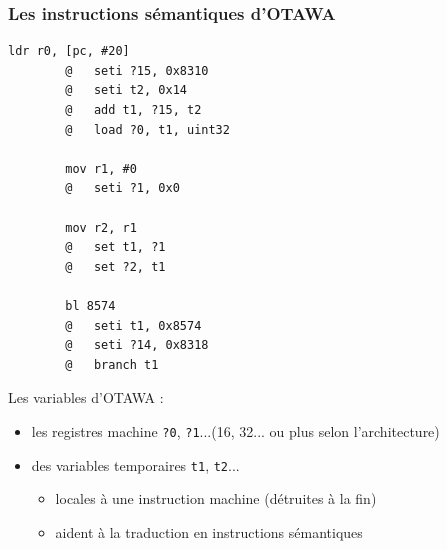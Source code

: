 \documentclass[table]{beamer}
\begin{document}
\begin{frame}[fragile]
    \frametitle{Les instructions sémantiques d'OTAWA}
    \begin{minipage}{.36\linewidth}
	\begin{lstlisting}[language={[ARM]Assembler}]
	    ldr r0, [pc, #20]
	    @	seti ?15, 0x8310
	    @	seti t2, 0x14
	    @	add t1, ?15, t2
	    @	load ?0, t1, uint32

	    mov r1, #0
	    @	seti ?1, 0x0

	    mov r2, r1
	    @	set t1, ?1
	    @	set ?2, t1

	    bl 8574
	    @	seti t1, 0x8574
	    @	seti ?14, 0x8318
	    @	branch t1
	\end{lstlisting}
    \end{minipage}
    \begin{minipage}{.62\linewidth}
	Les variables d'OTAWA :
    
	\begin{itemize}
	    \item les registres machine \texttt{?0}, \texttt{?1}...(16, 32... ou plus selon l'architecture)
	    \item des variables temporaires \texttt{t1}, \texttt{t2}...
	    \begin{itemize}
		\item locales à une instruction machine (détruites à la fin)
		\item aident à la traduction en instructions sémantiques
	    \end{itemize}
	\end{itemize}
    \end{minipage}
\end{frame}

\end{document}
